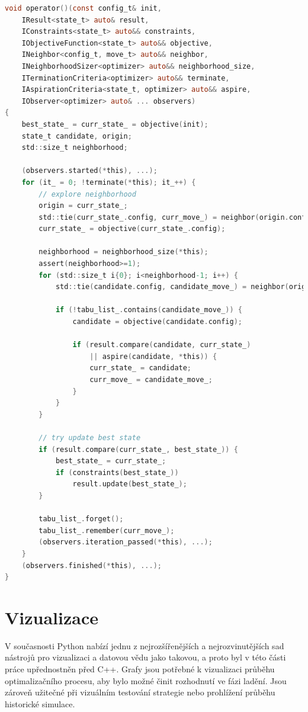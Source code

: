 \begin{lstlisting}[caption={~Implementace genetického algoritmu},label={lst:tabu:search},captionpos=t,abovecaptionskip=-\medskipamount,belowcaptionskip=\medskipamount,language=C]
void operator()(const config_t& init,
    IResult<state_t> auto& result,
    IConstraints<state_t> auto&& constraints,
    IObjectiveFunction<state_t> auto&& objective,
    INeighbor<config_t, move_t> auto&& neighbor,
    INeighborhoodSizer<optimizer> auto&& neighborhood_size,
    ITerminationCriteria<optimizer> auto&& terminate,
    IAspirationCriteria<state_t, optimizer> auto&& aspire,
    IObserver<optimizer> auto& ... observers)
{
    best_state_ = curr_state_ = objective(init);
    state_t candidate, origin;
    std::size_t neighborhood;

    (observers.started(*this), ...);
    for (it_ = 0; !terminate(*this); it_++) {
        // explore neighborhood
        origin = curr_state_;
        std::tie(curr_state_.config, curr_move_) = neighbor(origin.config);
        curr_state_ = objective(curr_state_.config);

        neighborhood = neighborhood_size(*this);
        assert(neighborhood>=1);
        for (std::size_t i{0}; i<neighborhood-1; i++) {
            std::tie(candidate.config, candidate_move_) = neighbor(origin.config);

            if (!tabu_list_.contains(candidate_move_)) {
                candidate = objective(candidate.config);

                if (result.compare(candidate, curr_state_)
                    || aspire(candidate, *this)) {
                    curr_state_ = candidate;
                    curr_move_ = candidate_move_;
                }
            }
        }

        // try update best state
        if (result.compare(curr_state_, best_state_)) {
            best_state_ = curr_state_;
            if (constraints(best_state_))
                result.update(best_state_);
        }

        tabu_list_.forget();
        tabu_list_.remember(curr_move_);
        (observers.iteration_passed(*this), ...);
    }
    (observers.finished(*this), ...);
}
\end{lstlisting}

\chapter{Vizualizace}
V současnosti Python nabízí jednu z nejrozšířenějších a nejrozvinutějších sad nástrojů pro vizualizaci a datovou vědu jako takovou, a proto byl v této části práce upřednostněn před C++.
Grafy jsou potřebné k vizualizaci průběhu optimalizačního procesu, aby bylo možné činit rozhodnutí ve fázi ladění.
Jsou zároveň užitečné při vizuálním testování strategie nebo prohlížení průběhu historické simulace.

